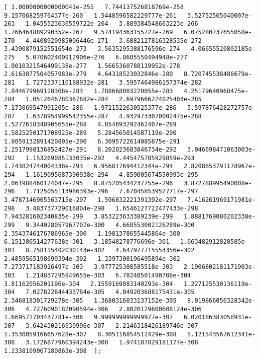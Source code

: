 \documentclass[11pt]{article}
\begin{document}
\begin{Verbatim}[commandchars=\\\{\}]
[ 1.0000000000000041e-255   7.744137526818769e-258   9.157068259764377e-260   1.5448596582229777e-261   3.52752565040007e-263   1.0455523636559722e-264   3.889384548663223e-266   1.766464889290352e-267   9.574194363155727e-269   6.075280737655058e-270   4.4408920985006446e-271   3.6882127816328535e-272   3.4390879152551654e-273   3.5635295388176596e-274   4.06655520802185e-275   5.070602400912906e-276   6.8605550494948e-277   1.0010321546499138e-277   1.5665360788119952e-278   2.6163877504057983e-279   4.64318523032846e-280   8.720745538486679e-281   1.7272337110188932e-281   3.5957464986157374e-282   7.844679969128308e-283   1.788668003220055e-283   4.25179640968475e-284   1.0512646780367682e-284   2.6979666224025403e-285   7.173069547991205e-286   1.9721522630525377e-286   5.597876428272757e-287   1.6378954999542355e-287   4.9329733070002475e-288   1.5272618348905655e-288   4.854693292462407e-289   1.5825250171708925e-289   5.284565014587119e-290   1.8059132891420805e-290   6.3095722614085875e-291   2.2517998136852427e-291   8.202023683846734e-292   3.046698471063003e-292   1.153269085133035e-292   4.445475785929859e-293   1.743824744004338e-293   6.956817694412344e-294   2.8208653791178967e-294   1.1619095687390938e-294   4.859005674550993e-295   2.061988460124047e-295   8.875205434237755e-296   3.872788995490008e-296   1.7125055113986393e-296   7.670458539527717e-297   3.4787146905563715e-297   1.596832221391392e-297   7.416261969171981e-298   3.483737729016804e-298   1.6546127722477433e-298   7.943281602340835e-299   3.853223633389239e-299   1.8881769080202338e-299   9.344028057967707e-300   4.668553002126289e-300   2.3543746176786965e-300   1.1981378655445864e-300   6.151386514277638e-301   3.18548278776696e-301   1.663482912828585e-301   8.758115402030143e-302   4.647977715554356e-302   2.4859565198699394e-302   1.3397300196495894e-302   7.273717183916497e-303   3.977725308585518e-303   2.1906802181171903e-303   1.214837295949655e-303   6.78240501490708e-304   3.81162056201196e-304   2.1559169083140293e-304   1.227125530136119e-304   7.027822844433784e-305   4.049203688175431e-305   2.346818301729278e-305   1.3680316033137152e-305   8.019866056328342e-306   4.7276090182090594e-306   2.8020129600608124e-306   1.669571703437781e-306   9.999999999999977e-307   6.020186383058931e-307   3.642430216930996e-307   2.2146318426189746e-307   1.3530059166657628e-307   8.305116854512429e-308   5.121543567612341e-308   3.1726877960394243e-308   1.974187829181177e-308   1.2338109067180863e-308  ];

\end{Verbatim}
\end{document}
